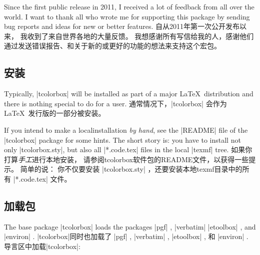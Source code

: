 \begin{tcolorbox}[enhanced,boxrule=0mm,boxsep=0mm,frame hidden,interior hidden,
left=0mm,right=0mm,top=0mm,bottom=0mm,watermark opacity=0.25,watermark zoom=1.2,before=\par\smallskip,
clip watermark=false,
watermark tikz={%
\path[fill=yellow,draw=yellow!75!red] (0,0) circle (1cm);
\fill[red] (45:5mm) circle (1mm);
\fill[red] (135:5mm) circle (1mm);
\draw[line width=1mm,red] (215:5mm) arc (215:325:5mm);}]
\begin{stripedbox}
Since the first public release in 2011, %
I received a lot of feedback from all over the world.%
I want to thank all who wrote me for supporting this package by sending bug reports and ideas for new or better features.
\tcblower
自从2011年第一次公开发布以来，%
我收到了来自世界各地的大量反馈。%
我想感谢所有写信给我的人，感谢他们通过发送错误报告、和关于新的或更好的功能的想法来支持这个宏包。
\end{stripedbox}
\end{tcolorbox}

\subsection{安装}

\begin{stripedbox}
Typically, |tcolorbox| will be installed as part of a major \LaTeX\ distribution
and there is nothing special to do for a user.
\tcblower
通常情况下，|tcolorbox| 会作为%
\LaTeX\ 发行版的一部分被安装。%
\end{stripedbox}

\begin{stripedbox}
If you intend to make a localinstallation \emph{by hand}, %
see the |README| file of the |tcolorbox| package for some hints. %
The short story is: you have to install not only |tcolorbox.sty|, %
but also all |*.code.tex| files in the local |texmf| tree.
\tcblower
如果你打算\emph{手工}进行本地安装，%
请参阅tcolorbox软件包的README文件，以获得一些提示。%
简单的说： 你不仅要安装 |tcolorbox.sty| ，还要安装本地texmf目录中的所有 |*.code.tex| 文件。
\end{stripedbox}

\subsection{加载包}


\begin{stripedbox}
The base package |tcolorbox| loads the packages
|pgf| %
, |verbatim| %
|etoolbox| %
, and |environ| %
.
\tcblower
|tcolorbox|同时也加载了%
|pgf| ,%
|verbatim| ,%
|etoolbox| ,%
和 |environ| .%
导言区中加载|tcolorbox|:
\end{stripedbox}


